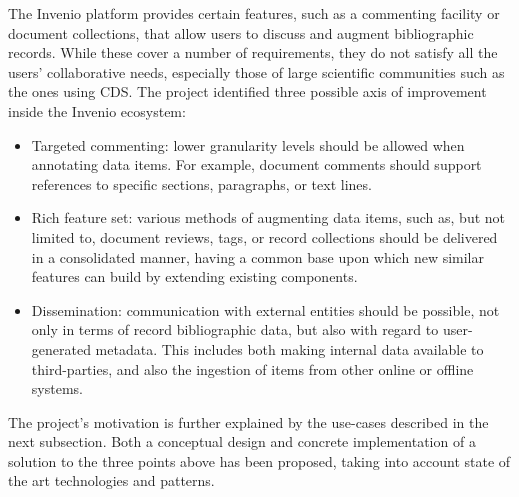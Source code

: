 
The Invenio platform provides certain features, such as a commenting facility
or document collections, that allow users to discuss and augment bibliographic
records. While these cover a number of requirements, they do not satisfy all
the users' collaborative needs, especially those of large scientific
communities such as the ones using CDS. The project identified three possible
axis of improvement inside the Invenio ecosystem:
\begin{itemize}
    \item Targeted commenting: lower granularity levels should be allowed when
      annotating  data items. For example, document comments
      should support references to specific sections, paragraphs, or text lines.
    \item Rich feature set: various methods of augmenting data items, such as,
      but not limited to, document reviews, tags, or record collections should
      be delivered in a consolidated manner, having a common base upon which new
      similar features can build by extending existing components.
    \item Dissemination: communication with external entities should be possible,
      not only in terms of record bibliographic data, but also with regard to
      user-generated metadata. This includes both making internal data available
      to third-parties, and also the ingestion of items from other online or
      offline systems.
\end{itemize}

The project's motivation is further explained by the use-cases described in the
next subsection. Both a conceptual design and concrete implementation of a
solution to the three points above has been proposed, taking into account state
of the art technologies and patterns.
